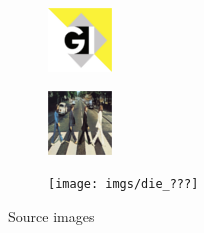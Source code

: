 \begin{figure}
\begin{subfigure}{.19\linewidth}
\end{subfigure}
\begin{subfigure}{.19\linewidth}
  \centering
  \includegraphics[width=0.7\linewidth]{imgs/gi}
\end{subfigure}
\begin{subfigure}{.19\linewidth}
  \centering
  \includegraphics[width=0.7\linewidth]{imgs/abbey}
\end{subfigure}
\begin{subfigure}{.19\linewidth}
  \centering
  \texttt{[image: imgs/die\_???]}
\end{subfigure}
\caption{Source images}
\label{fig:source_images}
\end{figure}

